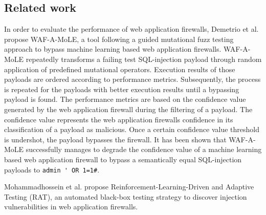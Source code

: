 \subsection{Related work}
In order to evaluate the performance of web application firewalls, Demetrio et al. \cite{rw/demetrio} propose WAF-A-MoLE, a tool following a guided mutational fuzz testing approach to bypass machine learning based web application firewalls. WAF-A-MoLE repeatedly transforms a failing test SQL-injection payload through random application of predefined mutational operators. Execution results of those payloads are ordered according to performance metrics. Subsequently, the process is repeated for the payloads with better execution results until a bypassing payload is found. The performance metrics are based on the confidence value generated by the web application firewall during the filtering of a payload. The confidence value represents the web application firewalls confidence in its classification of a payload as malicious. Once a certain confidence value threshold is undershot, the payload bypasses the firewall. It has been shown that WAF-A-MoLE successfully manages to degrade the confidence value of a machine learning based web application firewall to bypass a semantically equal SQL-injection payloads to \verb|admin ' OR 1=1#|.


Mohammadhossein et al. \cite{rw/mohammad} propose Reinforcement-Learning-Driven and Adaptive Testing (RAT), an automated black-box testing strategy to discover injection vulnerabilities in web application firewalls.
